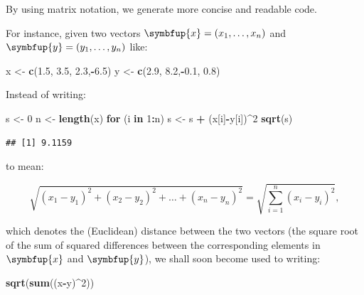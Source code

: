\documentclass[10pt,b5paper,krantz1]{krantz}
\newenvironment{Shaded}{\begin{snugshade}}{\end{snugshade}}
\newcommand{\ControlFlowTok}[1]{\textcolor[rgb]{0.27,0.27,0.27}{\textbf{#1}}}
\newcommand{\DecValTok}[1]{\textcolor[rgb]{0.06,0.06,0.06}{#1}}
\newcommand{\FloatTok}[1]{\textcolor[rgb]{0.06,0.06,0.06}{#1}}
\newcommand{\KeywordTok}[1]{\textcolor[rgb]{0.27,0.27,0.27}{\textbf{#1}}}
\newcommand{\NormalTok}[1]{#1}
\newcommand{\OperatorTok}[1]{\textcolor[rgb]{0.43,0.43,0.43}{\textbf{#1}}}
\newcommand{\StringTok}[1]{\textcolor[rgb]{0.5,0.5,0.5}{#1}}
\renewcommand{\boldsymbol}[1]{\symbfup{#1}}
\begin{document}
By using matrix notation, we generate more concise and readable code.

For instance, given two vectors \(\boldsymbol{x}=(x_1,\dots,x_n)\)
and \(\boldsymbol{y}=(y_1,\dots,y_n)\) like:

\begin{Shaded}
\begin{Highlighting}[]
\NormalTok{x <-}\StringTok{ }\KeywordTok{c}\NormalTok{(}\FloatTok{1.5}\NormalTok{, }\FloatTok{3.5}\NormalTok{, }\FloatTok{2.3}\NormalTok{,}\OperatorTok{-}\FloatTok{6.5}\NormalTok{)}
\NormalTok{y <-}\StringTok{ }\KeywordTok{c}\NormalTok{(}\FloatTok{2.9}\NormalTok{, }\FloatTok{8.2}\NormalTok{,}\OperatorTok{-}\FloatTok{0.1}\NormalTok{, }\FloatTok{0.8}\NormalTok{)}
\end{Highlighting}
\end{Shaded}

Instead of writing:

\begin{Shaded}
\begin{Highlighting}[]
\NormalTok{s <-}\StringTok{ }\DecValTok{0}
\NormalTok{n <-}\StringTok{ }\KeywordTok{length}\NormalTok{(x)}
\ControlFlowTok{for}\NormalTok{ (i }\ControlFlowTok{in} \DecValTok{1}\OperatorTok{:}\NormalTok{n)}
\NormalTok{    s <-}\StringTok{ }\NormalTok{s }\OperatorTok{+}\StringTok{ }\NormalTok{(x[i]}\OperatorTok{-}\NormalTok{y[i])}\OperatorTok{^}\DecValTok{2}
\KeywordTok{sqrt}\NormalTok{(s)}
\end{Highlighting}
\end{Shaded}

\begin{verbatim}
## [1] 9.1159
\end{verbatim}

to mean:

\[
\sqrt{
(x_1-y_1)^2 + (x_2-y_2)^2 + \dots + (x_n-y_n)^2
}
=
\sqrt{\sum_{i=1}^n (x_i-y_i)^2},
\]

which denotes the (Euclidean) distance between the two vectors
(the square root of the sum of squared differences between
the corresponding elements in \(\boldsymbol{x}\) and \(\boldsymbol{y}\)),
we shall soon become used to writing:

\begin{Shaded}
\begin{Highlighting}[]
\KeywordTok{sqrt}\NormalTok{(}\KeywordTok{sum}\NormalTok{((x}\OperatorTok{-}\NormalTok{y)}\OperatorTok{^}\DecValTok{2}\NormalTok{))}
\end{Highlighting}
\end{Shaded}
\end{document}
